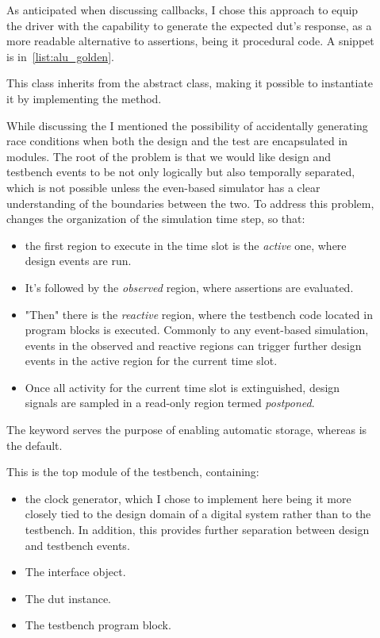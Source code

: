 \begin{description}
    \item[] As anticipated when discussing callbacks, I chose this approach to equip the driver with the capability to generate the expected \ac{dut}'s response, as a more readable alternative to \sv assertions, being it procedural code. A snippet is in~\cref{list:alu_golden}.
    
    \item[] This class inherits from the  abstract class, making it possible to instantiate it by implementing the  method.
    
    \item[] While discussing the  I mentioned the possibility of accidentally generating race conditions when both the design and the test are encapsulated in modules. The root of the problem is that we would like design and testbench events to be not only logically but also temporally separated, which is not possible unless the even-based simulator has a clear understanding of the boundaries between the two. To address this problem, \sv changes the organization of the simulation time step, so that:
    \begin{itemize}
        \item the first region to execute in the time slot is the \emph{active} one, where design events are run.
        \item It's followed by the \emph{observed} region, where assertions are evaluated.
        \item "Then" there is the \emph{reactive} region, where the testbench code located in program blocks is executed. Commonly to any event-based simulation, events in the observed and reactive regions can trigger further design events in the active region for the current time slot.
        \item Once all activity for the current time slot is extinguished, design signals are sampled in a read-only region termed \emph{postponed}.
    \end{itemize}

    The  keyword serves the purpose of enabling automatic storage, whereas  is the default.
    
    \item[] This is the top module of the testbench,
    containing:
    \begin{itemize}
        \item the clock generator, which I chose to implement here being it more closely tied to the design domain of a digital system rather than to the testbench. In addition, this provides further separation between design and testbench events.
        \item The interface object.
        \item The \ac{dut} instance.
        \item The testbench program block.
    \end{itemize}
\end{description}

